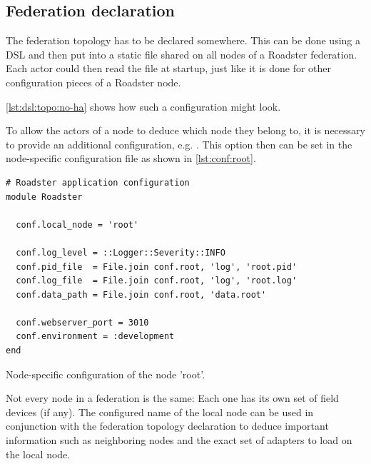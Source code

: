 \subsection{Federation declaration}
The federation topology has to be declared somewhere. This can be done using a
\gls{DSL} and then put into a static file shared
on all nodes of a Roadster federation. Each actor could then read the file at
startup, just like it is done for other configuration pieces of a Roadster node.

\autoref{lst:dsl:topo:no-ha} shows how such a configuration might look.

To allow the actors of a node to deduce which node they belong to, it is
necessary to provide an additional configuration, e.g. .
This option then can be set in the node-specific configuration file as shown in
\autoref{lst:conf:root}.

\begin{listing}
	\begin{verbatim}
# Roadster application configuration
module Roadster

  conf.local_node = 'root'

  conf.log_level = ::Logger::Severity::INFO
  conf.pid_file  = File.join conf.root, 'log', 'root.pid'
  conf.log_file  = File.join conf.root, 'log', 'root.log'
  conf.data_path = File.join conf.root, 'data.root'

  conf.webserver_port = 3010
  conf.environment = :development
end
	\end{verbatim}
	\caption{Node-specific configuration of the node 'root'.}
	\label{lst:conf:root}
\end{listing}

Not every node in a federation is the same: Each one has its own set of field devices (if any).
The configured name of the local node can be used in conjunction with the
federation topology declaration to deduce important information such as neighboring
nodes and the exact set of adapters to load on the local node.

